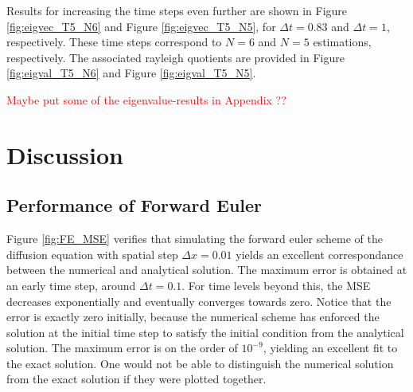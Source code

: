 \documentclass[12pt]{extarticle}
\begin{document}
Results for increasing the time steps even further are shown in Figure \ref{fig:eigvec_T5_N6} and Figure \ref{fig:eigvec_T5_N5}, for $\Delta t= 0.83$ and $\Delta t = 1$, respectively. These time steps correspond to $N=6$ and $N=5$ estimations, respectively. The associated rayleigh quotients are provided in Figure \ref{fig:eigval_T5_N6} and Figure \ref{fig:eigval_T5_N5}. 

\textcolor{red}{Maybe put some of the eigenvalue-results in Appendix ??}

 
\clearpage
\section{Discussion}

\subsection*{Performance of Forward Euler}
Figure \ref{fig:FE_MSE} verifies that simulating the forward euler scheme of the diffusion equation with spatial step $\Delta x = 0.01$ yields an excellent correspondance between the numerical and analytical solution. The maximum error is obtained at an early time step, around $\Delta t = 0.1$. For time levels beyond this, the MSE decreases exponentially and eventually converges towards zero. Notice that the error is exactly zero initially, because the numerical scheme has enforced the solution at the initial time step to satisfy the initial condition from the analytical solution. The maximum error is on the order of $10^{-9}$, yielding an excellent fit to the exact solution. One would not be able to distinguish the numerical solution from the exact solution if they were plotted together.
\end{document}
